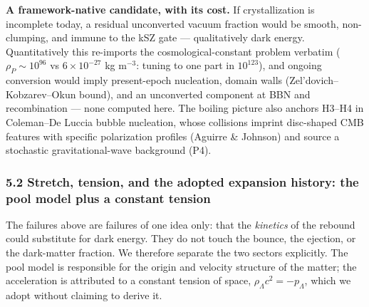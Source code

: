 \documentclass[
]{article}
\begin{document}
\textbf{A framework-native candidate, with its cost.} If crystallization
is incomplete today, a residual unconverted vacuum fraction would be
smooth, non-clumping, and immune to the kSZ gate --- qualitatively dark
energy. Quantitatively this re-imports the cosmological-constant problem
verbatim (\(\rho_P \sim 10^{96}\) vs \(6\times10^{-27}\) kg m\(^{-3}\):
tuning to one part in \(10^{123}\)), and ongoing conversion would imply
present-epoch nucleation, domain walls (Zel'dovich--Kobzarev--Okun
bound), and an unconverted component at BBN and recombination --- none
computed here. The boiling picture also anchors H3--H4 in Coleman--De
Luccia bubble nucleation, whose collisions imprint disc-shaped CMB
features with specific polarization profiles (Aguirre \& Johnson) and
source a stochastic gravitational-wave background (P4).

\hypertarget{stretch-tension-and-the-adopted-expansion-history-the-pool-model-plus-a-constant-tension}{%
\subsubsection{\texorpdfstring{\textbf{5.2 Stretch, tension, and the
adopted expansion history: the pool model plus a constant
tension}}{5.2 Stretch, tension, and the adopted expansion history: the pool model plus a constant tension}}\label{stretch-tension-and-the-adopted-expansion-history-the-pool-model-plus-a-constant-tension}}

The failures above are failures of one idea only: that the
\emph{kinetics} of the rebound could substitute for dark energy. They do
not touch the bounce, the ejection, or the dark-matter fraction. We
therefore separate the two sectors explicitly. The pool model is
responsible for the origin and velocity structure of the matter; the
acceleration is attributed to a constant tension of space,
\(\rho_\Lambda c^2 = -p_\Lambda\), which we adopt without claiming to
derive it.
\end{document}
